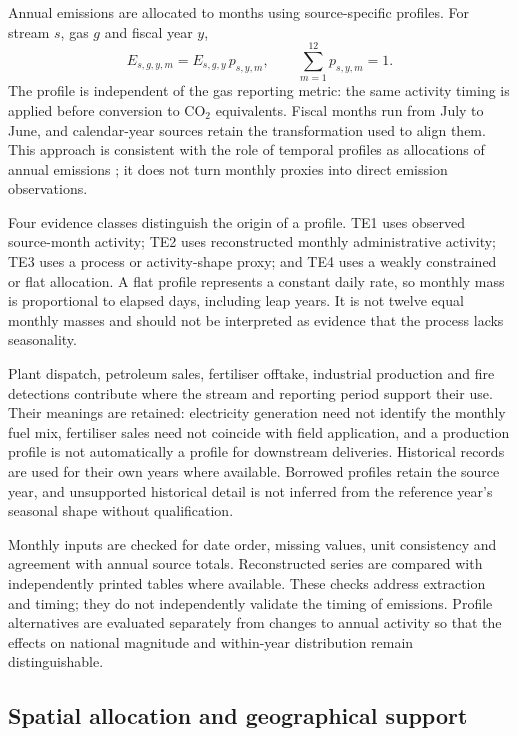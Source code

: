 \documentclass[essd]{copernicus}
\begin{document}
Annual emissions are allocated to months using source-specific profiles. For stream $s$, gas $g$ and fiscal year $y$,
\begin{equation}
 E_{s,g,y,m}=E_{s,g,y}\,p_{s,y,m},\qquad
 \sum_{m=1}^{12}p_{s,y,m}=1.
 \label{eq:monthly}
\end{equation}
The profile is independent of the gas reporting metric: the same activity timing is applied before conversion to CO$_2$ equivalents. Fiscal months run from July to June, and calendar-year sources retain the transformation used to align them. This approach is consistent with the role of temporal profiles as allocations of annual emissions \citep{Crippa2020}; it does not turn monthly proxies into direct emission observations.

Four evidence classes distinguish the origin of a profile. TE1 uses observed source-month activity; TE2 uses reconstructed monthly administrative activity; TE3 uses a process or activity-shape proxy; and TE4 uses a weakly constrained or flat allocation. A flat profile represents a constant daily rate, so monthly mass is proportional to elapsed days, including leap years. It is not twelve equal monthly masses and should not be interpreted as evidence that the process lacks seasonality.

Plant dispatch, petroleum sales, fertiliser offtake, industrial production and fire detections contribute where the stream and reporting period support their use. Their meanings are retained: electricity generation need not identify the monthly fuel mix, fertiliser sales need not coincide with field application, and a production profile is not automatically a profile for downstream deliveries. Historical records are used for their own years where available. Borrowed profiles retain the source year, and unsupported historical detail is not inferred from the reference year's seasonal shape without qualification.

Monthly inputs are checked for date order, missing values, unit consistency and agreement with annual source totals. Reconstructed series are compared with independently printed tables where available. These checks address extraction and timing; they do not independently validate the timing of emissions. Profile alternatives are evaluated separately from changes to annual activity so that the effects on national magnitude and within-year distribution remain distinguishable.

\subsection{Spatial allocation and geographical support}
\label{sec:spatial}
\end{document}
